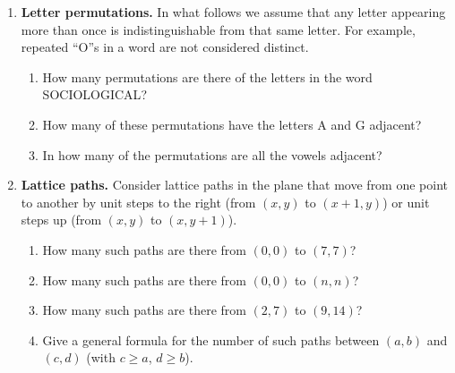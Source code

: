 \documentclass{article}
\theoremstyle{definition}
\begin{document}
\begin{enumerate}
\item \textbf{Letter permutations.}  
In what follows we assume that any letter appearing more than once 
is indistinguishable from that same letter. For example, repeated 
``O''s in a word are not considered distinct.
\begin{enumerate}[label=(\alph*)]
  \item How many permutations are there of the letters in the word \textsf{SOCIOLOGICAL}?
  \item How many of these permutations have the letters \textsf{A} and \textsf{G} adjacent?
  \item In how many of the permutations are all the vowels adjacent?
\end{enumerate}


\item \textbf{Lattice paths.}  
Consider lattice paths in the plane that move from one point to 
another by unit steps to the right (from $(x,y)$ to $(x+1,y)$) 
or unit steps up (from $(x,y)$ to $(x,y+1)$).
\begin{enumerate}[label=(\alph*)]
  \item How many such paths are there from $(0,0)$ to $(7,7)$?
  \item How many such paths are there from $(0,0)$ to $(n,n)$?
  \item How many such paths are there from $(2,7)$ to $(9,14)$?
  \item Give a general formula for the number of such paths between 
  $(a,b)$ and $(c,d)$ (with $c\ge a$, $d\ge b$).
\end{enumerate}



\end{enumerate}
\end{document}
